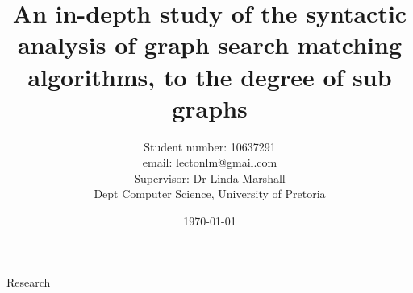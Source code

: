 \documentclass[titlepage]{article}
\title{An in-depth study of the syntactic analysis of graph  search matching algorithms, to the degree of sub graphs}
\author{Student number: 10637291 \\
		email: lectonlm@gmail.com \\
		Supervisor: Dr Linda Marshall \\
		Dept Computer Science, University of Pretoria}
\date{\today}
\begin{document}
\maketitle

\newpage

{Research}
\end{document}
